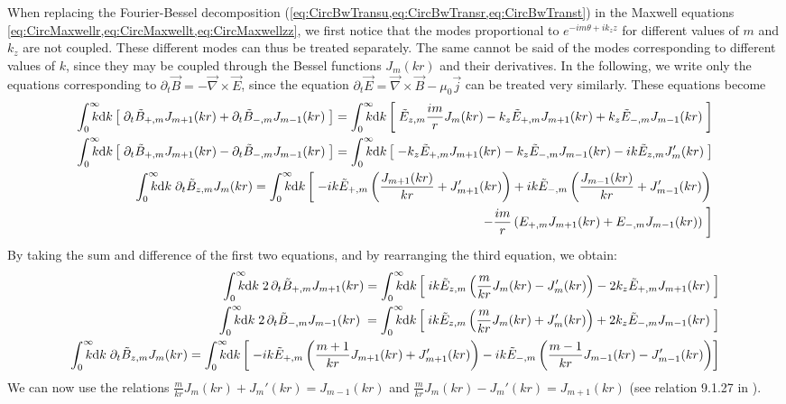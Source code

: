 When replacing the Fourier-Bessel decomposition
(\cref{eq:CircBwTransu,eq:CircBwTransr,eq:CircBwTranst}) in the
Maxwell equations \cref{eq:CircMaxwellr,eq:CircMaxwellt,eq:CircMaxwellzz}, we
first notice that the modes proportional to $e^{-im\theta +ik_z z}$ for different
values of $m$ and $k_z$ are not coupled. These different modes can
thus be treated separately. The same cannot be said of the modes
corresponding to different values of $k$, since they may be coupled
through the Bessel functions $J_m(kr)$ and their derivatives. 
In the following, we write only the equations corresponding to $\partial_t \vec{B} =
-\vec{\nabla}\times \vec{E}$, since the equation $\partial_t \vec{E} =
\vec{\nabla}\times\vec{B} - \mu_0 \vec{j}$ can be treated very
similarly. These equations become
\begin{align*}
\RInteg{k} \left[ \; \partial_t \tilde{B}_{+,m}  J_{m+1}(kr)
  + \partial_t \tilde{B}_{-,m}  J_{m-1}(kr) \; \right] =
\RInteg{k} \left[ \; \tilde{E}_{z,m} \frac{im}{r} J_m(kr) -
  k_z\tilde{E}_{+,m}J_{m+1}(kr) + k_z\tilde{E}_{-,m}J_{m-1}(kr) \;
\right] \\
\RInteg{k} \left[ \; \partial_t \tilde{B}_{+,m}  J_{m+1}(kr)
  - \partial_t \tilde{B}_{-,m}  J_{m-1}(kr) \; \right] =
\RInteg{k} \left[ \; -k_z\tilde{E}_{+,m}J_{m+1}(kr) -
  k_z\tilde{E}_{-,m}J_{m-1}(kr) - ik\tilde{E}_{z,m} J_m'(kr) \;
\right] \\
\RInteg{k}\; \partial_t \tilde{B}_{z,m}  J_{m}(kr) =
\RInteg{k} \left[ \; -ik\tilde{E}_{+,m}\left(\frac{J_{m+1}(kr)}{kr} +
    J_{m+1}'(kr) \right) + ik\tilde{E}_{-,m}\left(\frac{J_{m-1}(kr)}{kr} +
    J_{m-1}'(kr) \right) \right. \\
\qquad \left.- \frac{im}{r} \left( E_{+,m} J_{m+1}(kr) +
    E_{-,m} J_{m-1}(kr) \right) \;\right]
\end{align*}
By taking the sum and difference of the first two equations, and by
rearranging the third equation, we obtain:
\begin{align*}
\RInteg{k} \; 2 \,\partial_t \tilde{B}_{+,m}  J_{m+1}(kr) =
\RInteg{k} \left[ \; ik\tilde{E}_{z,m} \left( \frac{m}{kr} J_m(kr) -
    J_m'(kr) \right) -2 k_z\tilde{E}_{+,m}J_{m+1}(kr) \;
\right] \\
\RInteg{k} \; 2\, \partial_t \tilde{B}_{-,m}  J_{m-1}(kr) \; =
\RInteg{k} \left[ \;
   ik\tilde{E}_{z,m} \left( \frac{m}{kr} J_m(kr) +
    J_m'(kr) \right)  + 2k_z\tilde{E}_{-,m}J_{m-1}(kr) \;
\right] \\
\RInteg{k}\; \partial_t \tilde{B}_{z,m}  J_{m}(kr) =
\RInteg{k} \left[ \; -ik\tilde{E}_{+,m}\left(\frac{m+1}{kr}J_{m+1}(kr) +
    J_{m+1}'(kr) \right) - ik\tilde{E}_{-,m}\left(\frac{m-1}{kr}J_{m-1}(kr) -
    J_{m-1}'(kr) \right) \right] 
\end{align*}
We can now use the relations $\frac{m}{kr} J_m(kr) +
    J_m'(kr) = J_{m-1}(kr)$ and $\frac{m}{kr} J_m(kr) -
    J_m'(kr) = J_{m+1}(kr)$ (see relation 9.1.27 in
    \cite{Abramowitz}).


